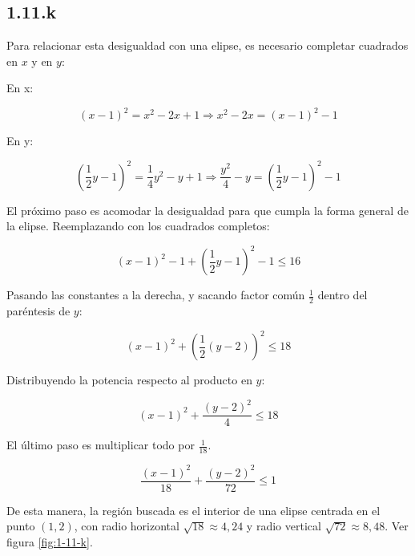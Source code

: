 \documentclass{article}
\begin{document}
\subsection*{1.11.k}
\label{subsec:1.11.k}

Para relacionar esta desigualdad con una elipse, es necesario completar cuadrados en $x$ y en $y$:

En x:

\begin{equation}
(x-1)^2 = x^2 -2x + 1 \Rightarrow x^2 - 2x = (x-1)^2 - 1
\end{equation}

En y:

\begin{equation}
\left (\frac{1}{2} y - 1 \right)^2 = \frac{1}{4}y^2 - y + 1 \Rightarrow \frac{y^2}{4} - y = (\frac{1}{2} y - 1)^2 - 1
\end{equation}

El próximo paso es acomodar la desigualdad para que cumpla la forma general de la elipse. Reemplazando con los cuadrados completos:

\begin{equation}
(x-1)^2 - 1 + \left( \frac{1}{2} y - 1 \right)^2 - 1 \leq 16
\end{equation}

Pasando las constantes a la derecha, y sacando factor común $\frac{1}{2}$ dentro del paréntesis de $y$:

\begin{equation}
(x-1)^2 + \left( \frac{1}{2} (y - 2) \right)^2 \leq 18
\end{equation}

Distribuyendo la potencia respecto al producto en $y$:

\begin{equation}
(x-1)^2 + \frac{(y-2)^2}{4} \leq 18
\end{equation}

El último paso es multiplicar todo por $\frac{1}{18}$.

\begin{equation}
\frac{(x-1)^2}{18} + \frac{(y-2)^2}{72} \leq 1
\end{equation}

De esta manera, la región buscada es el interior de una elipse centrada en el punto $(1, 2)$, con radio horizontal $\sqrt{18} \approx 4,24$ y radio vertical $\sqrt{72} \approx 8,48$. Ver figura \ref{fig:1-11-k}.
\end{document}
